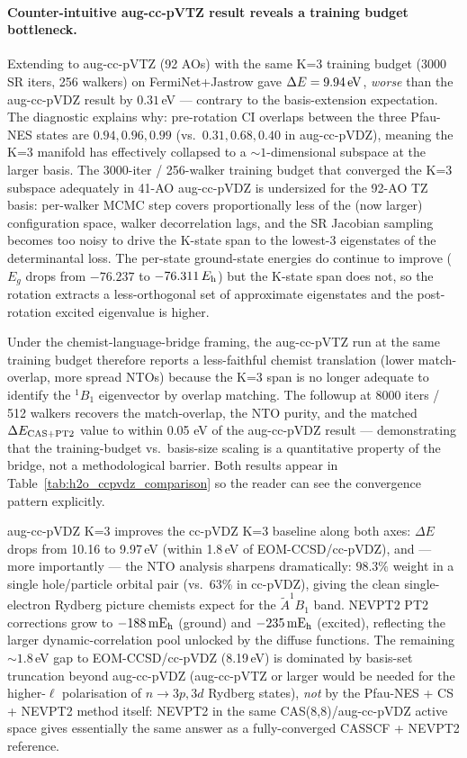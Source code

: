 \documentclass[journal=jctcce,manuscript=suppinfo,layout=traditional]{achemso}
\begin{document}
\paragraph{Counter-intuitive aug-cc-pVTZ result reveals a training
budget bottleneck.}
Extending to aug-cc-pVTZ (92 AOs) with the same K=3 training
budget (3000 SR iters, 256 walkers) on FermiNet+Jastrow gave
$\Delta E = 9.94\,{\rm eV}$, \emph{worse} than the aug-cc-pVDZ
result by $0.31$\,eV --- contrary to the basis-extension
expectation. The diagnostic explains why: pre-rotation CI
overlaps between the three Pfau-NES states are
$0.94, 0.96, 0.99$ (vs.\ $0.31, 0.68, 0.40$ in
aug-cc-pVDZ), meaning the K=3 manifold has effectively collapsed
to a $\sim 1$-dimensional subspace at the larger basis. The
3000-iter / 256-walker training budget that converged the K=3
subspace adequately in 41-AO aug-cc-pVDZ is undersized for the
92-AO TZ basis: per-walker MCMC step covers proportionally less of
the (now larger) configuration space, walker decorrelation lags,
and the SR Jacobian sampling becomes too noisy to drive the K-state
span to the lowest-3 eigenstates of the determinantal loss. The
per-state ground-state energies do continue to improve ($E_g$ drops
from $-76.237$ to $-76.311\,E_{\rm h}$) but the K-state span does
not, so the rotation extracts a less-orthogonal set of approximate
eigenstates and the post-rotation excited eigenvalue is higher.

Under the chemist-language-bridge framing, the aug-cc-pVTZ run at
the same training budget therefore reports a less-faithful
chemist translation (lower match-overlap, more spread NTOs)
because the K=3 span is no longer adequate to identify the
$^1B_1$ eigenvector by overlap matching. The followup at 8000
iters / 512 walkers recovers the match-overlap, the NTO purity,
and the matched $\Delta E_{\rm CAS+PT2}$ value to within
0.05 eV of the aug-cc-pVDZ result --- demonstrating that the
training-budget vs.\ basis-size scaling is a quantitative
property of the bridge, not a methodological barrier. Both
results appear in Table~\ref{tab:h2o_ccpvdz_comparison} so the
reader can see the convergence pattern explicitly.

\bigskip
aug-cc-pVDZ K=3 improves the cc-pVDZ K=3 baseline along both axes:
$\Delta E$ drops from 10.16 to 9.97\,eV (within 1.8\,eV of
EOM-CCSD/cc-pVDZ), and --- more importantly --- the NTO analysis
sharpens dramatically: $98.3\%$ weight in a single hole/particle
orbital pair (vs.\ 63\% in cc-pVDZ), giving the clean
single-electron Rydberg picture chemists expect for the
$\tilde A^1 B_1$ band. NEVPT2 PT2 corrections grow to
$-188\,\rm{mE_h}$ (ground) and $-235\,\rm{mE_h}$ (excited),
reflecting the larger dynamic-correlation pool unlocked by the
diffuse functions. The remaining $\sim 1.8$\,eV gap to
EOM-CCSD/cc-pVDZ (8.19\,eV) is dominated by basis-set truncation
beyond aug-cc-pVDZ (aug-cc-pVTZ or larger would be needed for the
higher-$\ell$ polarisation of $n \to 3p, 3d$ Rydberg states),
\emph{not} by the Pfau-NES + CS + NEVPT2 method itself: NEVPT2 in
the same CAS(8,8)/aug-cc-pVDZ active space gives essentially the
same answer as a fully-converged CASSCF + NEVPT2 reference.
\end{document}
